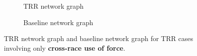 \documentclass[10pt]{article}
\begin{document}
\begin{figure}[H]
\captionsetup{font=small}
    \begin{subfigure}{0.5\textwidth}
        \caption{TRR network graph}
        \label{trr_cross_race}
    \end{subfigure}%
    \begin{subfigure}{0.5\textwidth}
        \caption{Baseline network graph}
        \label{baseline_cross_race}
    \end{subfigure}
\caption{TRR network graph and baseline network graph for TRR cases involving only \textbf{cross-race use of force}.}
\end{figure}
\end{document}
